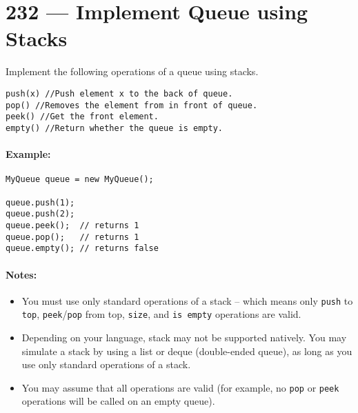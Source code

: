 \section{232 --- Implement Queue using Stacks}
Implement the following operations of a queue using stacks.
\begin{flushleft}
\begin{lstlisting}[style=customc]
push(x) //Push element x to the back of queue.
pop() //Removes the element from in front of queue.
peek() //Get the front element.
empty() //Return whether the queue is empty.
\end{lstlisting}
\end{flushleft}

\paragraph{Example:}

\begin{flushleft}
\begin{lstlisting}[style=customc]
MyQueue queue = new MyQueue();

queue.push(1);
queue.push(2);  
queue.peek();  // returns 1
queue.pop();   // returns 1
queue.empty(); // returns false
\end{lstlisting}
\end{flushleft}

\paragraph{Notes:}

\begin{itemize}
\item You must use only standard operations of a stack -- which means only \texttt{push} to \texttt{top}, \texttt{peek}/\texttt{pop} from top, \texttt{size}, and \texttt{is empty} operations are valid.
\item Depending on your language, stack may not be supported natively. You may simulate a stack by using a list or deque (double-ended queue), as long as you use only standard operations of a stack.
\item You may assume that all operations are valid (for example, no \texttt{pop} or \texttt{peek} operations will be called on an empty queue).
\end{itemize}
